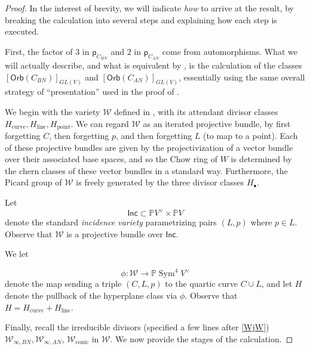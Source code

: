 \documentclass[12 pt, reqno]{amsart}
\theoremstyle{definition}
\newcommand{\on}{\operatorname}
\newcommand{\mb}{\mathbb}
\renewcommand{\P}{\mb{P}}
\newcommand{\Orb}{\mathsf{Orb}}
\newcommand{\p}{\mathsf{p}}
\begin{document}
\begin{proof}

  In the interest of brevity, we will indicate {\sl how} to arrive at
  the result, by breaking the calculation into several steps and
  explaining how each step is executed.

  First, the factor of $3$ in $\p_{C_{BN}}$ and $2$ in $\p_{C_{AN}}$
  come from automorphisms.  What we will actually describe, and what
  is equivalent by , is the calculation of the
  classes $[\Orb(C_{BN})]_{GL(V)}$ and $[\Orb(C_{AN})]_{GL(V)}$,
  essentially using the same overall strategy of ``presentation'' used
  in the proof of .


  We begin with the variety $\mathcal{W}$ defined in ,
  with its attendant divisor classes
  $H_{\on{curve}}, H_{\on{line}}, H_{\on{point}}$. We can regard
  $\mathcal{W}$ as an iterated projective bundle, by first forgetting
  $C$, then forgetting $p$, and then forgetting $L$ (to map to a
  point). Each of these projective bundles are given by the
  projectivization of a vector bundle over their associated base
  spaces, and so the Chow ring of $W$ is determined by the chern
  classes of these vector bundles in a standard way.  Furthermore, the
  Picard group of $\mathcal{W}$ is freely generated by the three
  divisor classes $H_{\bullet}$.

  Let
  \[\mathsf{Inc} \subset \P V^{\vee} \times \P V\] denote the standard
  {\sl incidence variety} parametrizing pairs $(L,p)$ where $p \in L$.
  Observe that $\mathcal{W}$ is a projective bundle over
  $\mathsf{Inc}$.

  We let

  
  \[\phi: \mathcal{W} \to \P \on{Sym}^{4}V^{\vee}\]
  denote the map sending a triple $(C,L,p)$ to the quartic curve
  $C \cup L$, and let $H$ denote the pullback of the hyperplane class
  via $\phi$.  Observe that $H = H_{\on{curve}} + H_{\on{line}}$.

  Finally, recall the irreducible divisors (specified a few lines
  after \eqref{WjW})
  $\mathcal{W}_{\infty,BN}, \mathcal{W}_{\infty,AN}$,
  $\mathcal{W}_{\on{conic}}$ in $\mathcal{W}$. We now provide the
  stages of the calculation.



\end{proof}
\end{document}
